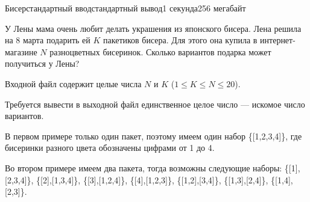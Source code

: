 \begin{problem}{Бисер}{стандартный ввод}{стандартный вывод}{1 секунда}{256 мегабайт}

У Лены мама очень любит делать украшения из японского бисера. Лена решила на 8 марта подарить ей $K$ пакетиков бисера. Для этого она купила в интернет-магазине $N$ разноцветных бисеринок. Сколько вариантов подарка может получиться у Лены? 



\InputFile
Входной файл содержит целые числа $N$ и $K$ ($1 \le K \le N \le 20$). 

\OutputFile
Требуется вывести в выходной файл единственное целое число --- искомое число вариантов.

\Examples

\begin{example}
%
%
\end{example}

\Explanations
В первом примере только один пакет, поэтому имеем один набор \{[1,2,3,4]\}, где бисеринки разного цвета обозначены цифрами от 1 до 4.
 
Во втором примере имеем два пакета, тогда возможны следующие наборы: \{[1],[2,3,4]\}, \{[2],[1,3,4]\}, \{[3],[1,2,4]\}, \{[4],[1,2,3]\}, \{[1,2],[3,4]\}, \{[1,3],[2,4]\}, \{[1,4],[2,3]\}.


\end{problem}

